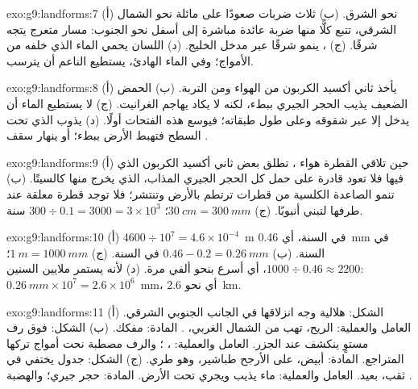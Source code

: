 \begin{solution}{exo:g9:landforms:7}
(أ) نحو الشرق. (ب) ثلاث ضربات صعودًا على  مائلة نحو الشمال
الشرقي، تتبع كلًّا منها ضربة عائدة مباشرة إلى أسفل نحو الجنوب: مسار
متعرج يتجه شرقًا. (ج) ، ينمو شرقًا عبر مدخل الخليج. (د) اللسان
يحمي الماء الذي خلفه من الأمواج؛ وفي الماء الهادئ، يستطيع  الناعم
أن يترسب.
\end{solution}

\begin{solution}{exo:g9:landforms:8}
(أ) يأخذ ثاني أكسيد الكربون من الهواء ومن التربة. (ب) الحمض الضعيف يذيب
الحجر الجيري ببطء، لكنه لا يكاد يهاجم الغرانيت. (ج) لا يستطيع الماء أن
يدخل  إلا عبر شقوقه وعلى طول طبقاته؛ فيوسع هذه الفتحات أولًا.
(د) يذوب  الذي تحت السطح فتهبط الأرض ببطء؛ أو ينهار سقف
.
\end{solution}

\begin{solution}{exo:g9:landforms:9}
(أ) حين تلاقي القطرة هواء ، تطلق بعض ثاني أكسيد الكربون الذي فيها
فلا تعود قادرة على حمل كل الحجر الجيري المذاب، الذي يخرج منها كالسيتًا.
(ب) تنمو الصاعدة الكلسية من قطرات ترتطم بالأرض وتنتشر؛ فلا توجد قطرة
معلقة عند طرفها لتبني أنبوبًا.
(ج) $\qty{30}{cm} = \qty{300}{mm}$؛ $300 \div 0.1 = 3000 = 3 \times 10^3$
سنة.
\end{solution}

\begin{solution}{exo:g9:landforms:10}
(أ) $4600 \div 10^7 = 4.6 \times 10^{-4}$~m في السنة، أي \qty{0.46}{mm} في
السنة. (ب) $0.46 - 0.2 = \qty{0.26}{mm}$ في السنة. (ج) $\qty{1}{m} =
\qty{1000}{mm}$؛ $1000 \div 0.46 \approx 2200$، أي أسرع بنحو ألفي
مرة. (د) لأنه يستمر ملايين السنين: $\qty{0.26}{mm} \times
10^7 = 2.6 \times 10^6$~mm، أي نحو \qty{2.6}{km}.
\end{solution}

\begin{solution}{exo:g9:landforms:11}
(أ) الشكل:  هلالية وجه انزلاقها في الجانب الجنوبي الشرقي. العامل
والعملية: الريح، تهب من الشمال الغربي، . المادة:  مفكك.
(ب) الشكل:  فوق رف مستوٍ ينكشف عند الجزر. العامل والعملية: ،
؛ والرف مصطبة نحت أمواج تركها  المتراجع. المادة:  أبيض، على
الأرجح طباشير، وهو  طري. (ج) الشكل: جدول يختفي في ثقب،  بعيد.
العامل والعملية: ماء يذيب  ويجري تحت الأرض. المادة: حجر جيري؛
والهضبة
.
\end{solution}

